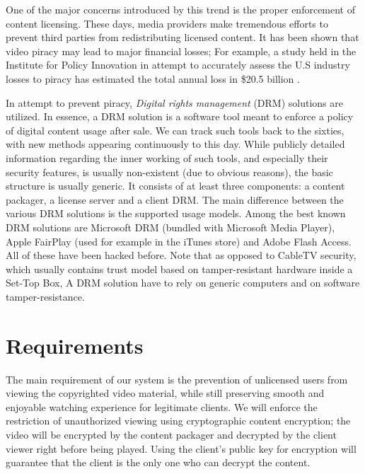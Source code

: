\documentclass[conference]{IEEEtran}
\begin{document}
One of the major concerns introduced by this trend is the proper
enforcement of content licensing. These days, media providers make
tremendous efforts to prevent third parties from redistributing licensed
content. It has been shown that video piracy may lead to major financial
losses; For example, a study held in the Institute for Policy Innovation
in attempt to accurately assess the U.S industry losses to piracy has
estimated the total annual loss in \$20.5 billion \cite{1}.

In attempt to prevent piracy, \emph{Digital rights management} (DRM)
solutions are utilized. In essence, a DRM solution is a software tool
meant to enforce a policy of digital content usage after sale. We
can track such tools back to the sixties, with new methods appearing
continuously to this day. While publicly detailed information regarding
the inner working of such tools, and especially their security features,
is usually non-existent (due to obvious reasons), the basic structure
is usually generic. It consists of at least three components: a content
packager, a license server and a client DRM. The main difference between
the various DRM solutions is the supported usage models. Among the best
known DRM solutions are Microsoft DRM (bundled with Microsoft Media
Player), Apple FairPlay (used for example in the iTunes store) and
Adobe Flash Access. All of these have been hacked before. Note that as
opposed to CableTV security, which usually contains trust model based on
tamper-resistant hardware inside a Set-Top Box, A DRM solution have to
rely on generic computers and on software tamper-resistance.

\section{Requirements}

The main requirement of our system is the prevention of unlicensed users
from viewing the copyrighted video material, while still preserving
smooth and enjoyable watching experience for legitimate clients. We
will enforce the restriction of unauthorized viewing using cryptographic content
encryption; the video will be encrypted by the content packager and
decrypted by the client viewer right before being played. Using the
client's public key for encryption will guarantee that the client is the
only one who can decrypt the content.
\end{document}
